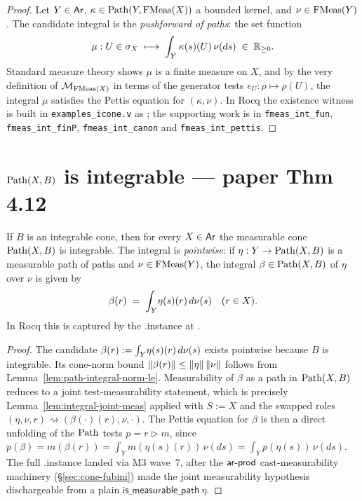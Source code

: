 \begin{proof}
Let $Y \in \mathsf{Ar}$, $\kappa \in \mathrm{Path}(Y, \mathrm{FMeas}(X))$ a bounded kernel,
and $\nu \in \mathrm{FMeas}(Y)$. The candidate integral is the
\emph{pushforward of paths}: the set function
\[
  \mu : U \in \sigma_X \;\longmapsto\; \int_Y \kappa(s)(U)\,\nu(ds)
  \;\in\; \mathbb{R}_{\geq 0}.
\]
Standard measure theory shows $\mu$ is a finite measure on $X$, and
by the very definition of $\mathcal{M}_{\mathrm{FMeas}(X)}$ in terms of the
generator tests $e_U : \rho \mapsto \rho(U)$, the integral $\mu$
satisfies the Pettis equation for $(\kappa, \nu)$. In Rocq the
existence witness is built in \texttt{examples\_icone.v} as
; the supporting
work is in \texttt{fmeas\_int\_fun}, \texttt{fmeas\_int\_finP},
\texttt{fmeas\_int\_canon} and \texttt{fmeas\_int\_pettis}.
\end{proof}

\section{\texorpdfstring{$\mathrm{Path}(X, B)$}{Path(X, B)} is integrable --- paper Thm 4.12}%
\label{sec:path-icone}

\begin{theorem}\label{thm:path-icone}
If $B$ is an integrable cone, then for every $X \in \mathsf{Ar}$ the
measurable cone $\mathrm{Path}(X, B)$ is integrable. The integral is
\emph{pointwise}: if $\eta : Y \to \mathrm{Path}(X, B)$ is a measurable path
of paths and $\nu \in \mathrm{FMeas}(Y)$, the integral $\beta \in \mathrm{Path}(X, B)$
of $\eta$ over $\nu$ is given by
\[
  \beta(r) \;=\; \int_{Y}\!\eta(s)(r)\,d\nu(s) \quad (r \in X).
\]
In Rocq this is captured by the \HB.instance at
. \rocqok
\end{theorem}

\begin{proof}
The candidate $\beta(r) := \int_{Y}\!\eta(s)(r)\,d\nu(s)$ exists
pointwise because $B$ is integrable. Its cone-norm bound
$\lVert \beta(r) \rVert \leq \lVert \eta \rVert\,\lVert \nu \rVert$ follows from
Lemma~\ref{lem:path-integral-norm-le}. Measurability of $\beta$ as
a path in $\mathrm{Path}(X, B)$ reduces to a joint test-measurability
statement, which is precisely
Lemma~\ref{lem:integral-joint-meas} applied with $S := X$ and the
swapped roles $(\eta, \nu, r) \rightsquigarrow (\beta(\cdot)(r), \nu, \cdot)$.
The Pettis equation for $\beta$ is then a direct unfolding of the
$\mathrm{Path}$ tests $p = r \rhd m$, since
$p(\beta) = m(\beta(r)) = \int_Y m(\eta(s)(r))\,\nu(ds) = \int_Y p(\eta(s))\,\nu(ds)$.
The full \HB.instance landed via M3 wave~7, after the $\mathsf{ar}\text{-}\mathsf{prod}$
cast-measurability machinery (\S\ref{sec:cone-fubini}) made the joint
measurability hypothesis dischargeable from a plain
$\mathsf{is\_measurable\_path}\ \eta$.
\end{proof}

